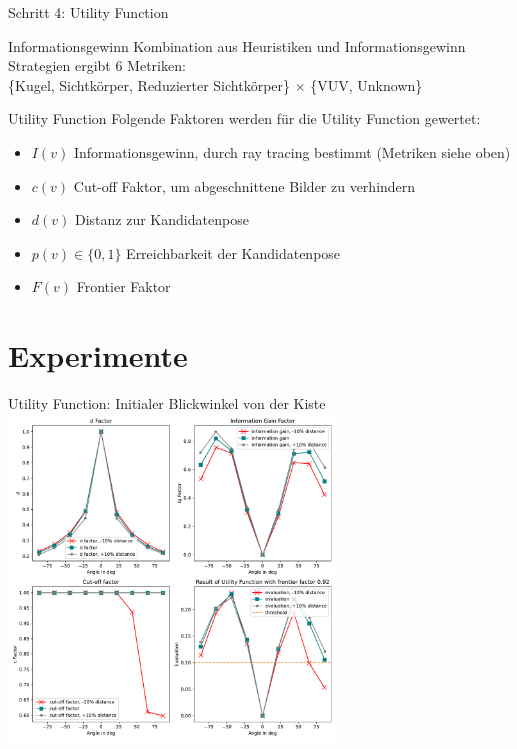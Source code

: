 \documentclass{beamer}
\begin{document}
\begin{frame}{Schritt 4: Utility Function}

	\begin{exampleblock}{Informationsgewinn}
		Kombination aus Heuristiken und Informationsgewinn Strategien ergibt 6 Metriken:
		\\ \{Kugel, Sichtkörper, Reduzierter Sichtkörper\} $\times$ \{VUV, Unknown\}
	\end{exampleblock}
	\begin{block}{Utility Function}
		Folgende Faktoren werden für die Utility Function gewertet:
		\begin{itemize}
			\item $I(v)$ Informationsgewinn, durch ray tracing bestimmt (Metriken siehe oben)
			\item $c(v)$ Cut-off Faktor, um abgeschnittene Bilder zu verhindern
			\item $d(v)$ Distanz zur Kandidatenpose
			\item $p(v) \in \{0,1\}$ Erreichbarkeit der Kandidatenpose
			\item $F(v)$ Frontier Faktor
		\end{itemize}
	\end{block}
\end{frame}

\section{Experimente}
\begin{frame}{Utility Function: Initialer Blickwinkel von der Kiste}
	\centering
	\includegraphics[width=0.65\textwidth]{Graphics/crate_allinone_first.pdf}
\end{frame}
\end{document}
